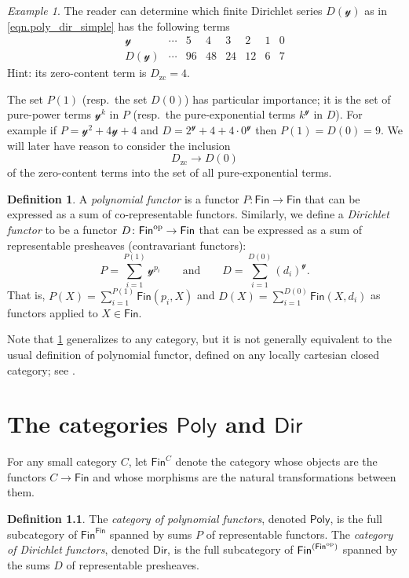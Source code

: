 \documentclass[11pt, article, one side]{memoir}
\theoremstyle{theorem}
\theoremstyle{definition}
\newtheorem{definition}[section]{Definition}
\theoremstyle{remark}
\newtheorem{example}[section]{Example}
\newcommand{\Cat}[1]{\mathsf{#1}}%
\newcommand{\op}{^\tn{op}}
\newcommand{\tn}[1]{\textnormal{#1}}
\newcommand{\finset}{\Cat{Fin}}
\newcommand{\zero}[1]{#1_\text{zc}}
\newcommand{\yon}{\mathcal{y}}
\newcommand{\poly}{\Cat{Poly}}
\newcommand{\dir}{\Cat{Dir}}
\newcommand{\mdot}{{\cdot}}
\newcommand{\qqand}{\qquad\text{and}\qquad}
\begin{document}
\begin{example}
The reader can determine which finite Dirichlet series $D(\yon)$ as in \cref{eqn.poly_dir_simple} has the following terms
\[
\begin{array}{c|ccccccc}
\yon&
\cdots&
5&
4&
3&
2&
1&
0
\\\hline
D(\yon)&
\cdots&
96&
48&
24&
12&
6&
7
\end{array}
\]
Hint: its zero-content term is $\zero{D}=4$.
\end{example}

The set $P(1)$ (resp.\ the set $D(0)$) has particular importance; it is the set of pure-power terms $\yon^k$ in $P$ (resp.\ the pure-exponential terms $k^\yon$ in $D$). For example if $P=\yon^2+4\yon+4$ and $D=2^\yon+4+4\mdot0^\yon$ then $P(1)=D(0)=9$. We will later have reason to consider the inclusion
\begin{equation}\label{eqn.zerocontent}
\zero{D}\to D(0)
\end{equation}
of the zero-content terms into the set of all pure-exponential terms.

\begin{definition}\label{def.poly_dir_obs}
A \emph{polynomial functor} is a functor $P\colon\finset\to\finset$ that can be expressed as a sum of co-representable functors. Similarly, we define a \emph{Dirichlet functor} to be a functor $D\colon\finset\op\to\finset$ that can be expressed as a sum of representable presheaves (contravariant functors):
\begin{equation}\label{eqn.finite_sum}
  P=\sum_{i=1}^{P(1)}\yon^{p_i}
  \qqand
  D=\sum_{i=1}^{D(0)}(d_i)^\yon.
\end{equation}
That is, $P(X)=\sum_{i=1}^{P(1)}\finset(p_i,X)$ and $D(X)=\sum_{i=1}^{D(0)}\finset(X,d_i)$ as functors applied to $X\in\finset$.
\end{definition}

Note that \cref{def.poly_dir_obs} generalizes to any category, but it is not generally equivalent to the usual definition of polynomial functor, defined on any locally cartesian closed category; see \cite{GK:Polynomial.Functors}.

\chapter{The categories $\poly$ and $\dir$}

For any small category $C$, let $\finset^C$ denote the category whose objects are the functors $C\to\finset$ and whose morphisms are the natural transformations between them.
\begin{definition}\label{def.poly_dir}
The \emph{category of polynomial functors}, denoted $\poly$, is the full subcategory of $\finset^\finset$ spanned by sums $P$ of representable functors. The \emph{category of Dirichlet functors}, denoted $\dir$, is the full subcategory of $\finset^{(\finset\op)}$ spanned by the sums $D$ of representable presheaves.
\end{definition}
\end{document}
